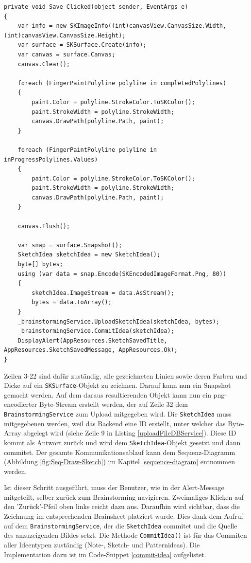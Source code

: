 \begin{lstlisting}[label={save-clicked-sketch},caption={Save Click-Eventhandler}]
private void Save_Clicked(object sender, EventArgs e)
{
	var info = new SKImageInfo((int)canvasView.CanvasSize.Width, (int)canvasView.CanvasSize.Height);
	var surface = SKSurface.Create(info);
	var canvas = surface.Canvas;
	canvas.Clear();
	
	foreach (FingerPaintPolyline polyline in completedPolylines)
	{
		paint.Color = polyline.StrokeColor.ToSKColor();
		paint.StrokeWidth = polyline.StrokeWidth;
		canvas.DrawPath(polyline.Path, paint);
	}
	
	foreach (FingerPaintPolyline polyline in inProgressPolylines.Values)
	{
		paint.Color = polyline.StrokeColor.ToSKColor();
		paint.StrokeWidth = polyline.StrokeWidth;
		canvas.DrawPath(polyline.Path, paint);
	}
	
	canvas.Flush();
	
	var snap = surface.Snapshot();
	SketchIdea sketchIdea = new SketchIdea();
	byte[] bytes;
	using (var data = snap.Encode(SKEncodedImageFormat.Png, 80))
	{
		sketchIdea.ImageStream = data.AsStream();
		bytes = data.ToArray();
	}
	_brainstormingService.UploadSketchIdea(sketchIdea, bytes);
	_brainstormingService.CommitIdea(sketchIdea);
	DisplayAlert(AppResources.SketchSavedTitle, AppResources.SketchSavedMessage, AppResources.Ok);
}
\end{lstlisting}
Zeilen 3-22 sind dafür zuständig, alle gezeichneten Linien sowie deren Farben und Dicke auf ein \texttt{SKSurface}-Objekt zu zeichnen. Darauf kann nun ein Snapshot gemacht werden. Auf dem daraus resultierenden Objekt kann nun ein png-encodierter Byte-Stream erstellt werden, der auf Zeile 32 dem \texttt{BrainstormingService} zum Upload mitgegeben wird. Die \texttt{SketchIdea} muss mitgegebenen werden, weil das Backend eine ID erstellt, unter welcher das Byte-Array abgelegt wird (siehe Zeile 9 in Listing \ref{uploadFileDBService}). Diese ID kommt als Antwort zurück und wird dem \texttt{SketchIdea}-Objekt gesetzt und dann commitet. Der gesamte Kommunikationsablauf kann dem Sequenz-Diagramm (Abbildung \ref{fig:Seq-Draw-Sketch}) im Kapitel \ref{sequence-diagram} entnommen werden. 

Ist dieser Schritt ausgeführt, muss der Benutzer, wie in der Alert-Message mitgeteilt, selber zurück zum Brainstorming navigieren. Zweimaliges Klicken auf den 'Zurück'-Pfeil oben links reicht dazu aus. Daraufhin wird sichtbar, dass die Zeichnung im entsprechenden Brainsheet platziert wurde. Dies dank dem Aufruf auf dem \texttt{BrainstormingService}, der die \texttt{SketchIdea} commitet und die Quelle des anzuzeigenden Bildes setzt. Die Methode \texttt{CommitIdea()} ist für das Commiten aller Ideentypen zuständig (Note-, Sketch- und Patternideas). Die Implementation dazu ist im Code-Snippet \ref{commit-idea} aufgelistet.

